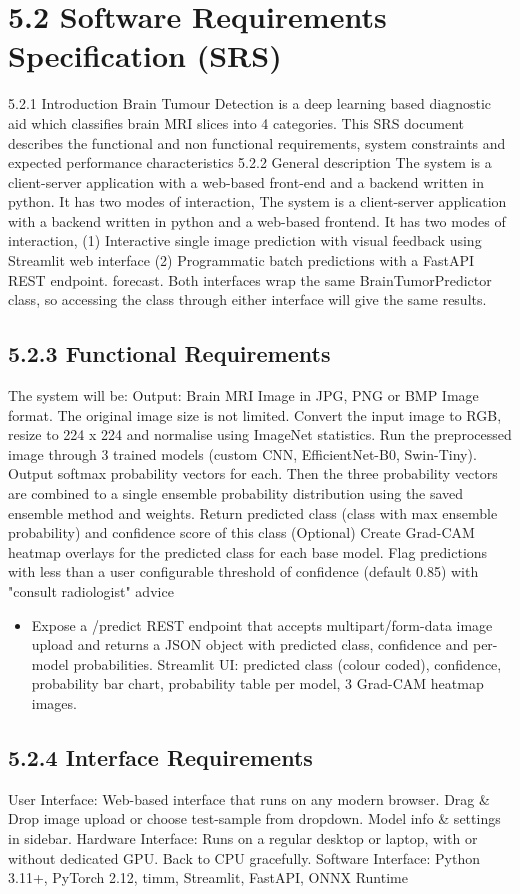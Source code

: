 \documentclass[12pt,a4paper,oneside]{report}
\begin{document}
\section{5.2 Software Requirements Specification (SRS)}
5.2.1 Introduction
Brain Tumour Detection is a deep learning based diagnostic aid which classifies brain MRI slices into 4 categories. This SRS document describes the functional and non functional requirements, system constraints and expected performance characteristics
5.2.2 General description
The system is a client-server application with a web-based front-end and a backend written in python. It has two modes of interaction,
The system is a client-server application with a backend written in python and a web-based frontend. It has two modes of interaction,
(1) Interactive single image prediction with visual feedback using Streamlit web interface
(2) Programmatic batch predictions with a FastAPI REST endpoint. forecast. Both interfaces wrap the same BrainTumorPredictor class, so accessing the class through either interface will give the same results.
\subsection{5.2.3 Functional Requirements}
The system will be:
Output: Brain MRI Image in JPG, PNG or BMP Image format. The original image size is not limited.
Convert the input image to RGB, resize to 224 x 224 and normalise using ImageNet statistics.
Run the preprocessed image through 3 trained models (custom CNN, EfficientNet-B0, Swin-Tiny). Output softmax probability vectors for each.
Then the three probability vectors are combined to a single ensemble probability distribution using the saved ensemble method and weights.
Return predicted class (class with max ensemble probability) and confidence score of this class
(Optional) Create Grad-CAM heatmap overlays for the predicted class for each base model.
Flag predictions with less than a user configurable threshold of confidence (default 0.85) with "consult radiologist" advice
\begin{itemize}[leftmargin=*]
  \item Expose a /predict REST endpoint that accepts multipart/form-data image upload and returns a JSON object with predicted class, confidence and per-model probabilities. Streamlit UI: predicted class (colour coded), confidence, probability bar chart, probability table per model, 3 Grad-CAM heatmap images.
\end{itemize}
\subsection{5.2.4 Interface Requirements}
User Interface:
Web-based interface that runs on any modern browser.
Drag \& Drop image upload or choose test-sample from dropdown.
Model info \& settings in sidebar.
Hardware Interface:
Runs on a regular desktop or laptop, with or without dedicated GPU. Back to CPU gracefully.
Software Interface:
Python 3.11+, PyTorch 2.12, timm, Streamlit, FastAPI, ONNX Runtime
\end{document}
